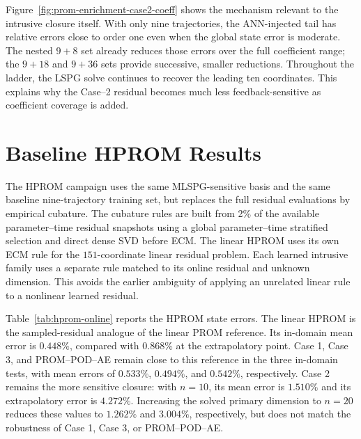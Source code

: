 \documentclass[11pt]{article}
\begin{document}
Figure~\ref{fig:prom-enrichment-case2-coeff} shows the mechanism relevant to the intrusive closure itself.  With
only nine trajectories, the ANN-injected tail has relative errors close to order one even when the global state error
is moderate.  The nested $9+8$ set already reduces those errors over the full coefficient range; the $9+18$ and
$9+36$ sets provide successive, smaller reductions.  Throughout the ladder, the LSPG solve continues to recover the leading ten
coordinates.  This explains why the Case--2 residual becomes much less feedback-sensitive as coefficient coverage
is added.

\section{Baseline HPROM Results}
The HPROM campaign uses the same MLSPG-sensitive basis and the same baseline nine-trajectory training set, but
replaces the full residual evaluations by empirical cubature.  The cubature rules are built from 2\% of the
available parameter--time residual snapshots using a global parameter--time stratified selection and direct dense
SVD before ECM.  The linear HPROM uses its own ECM rule for the \(151\)-coordinate linear residual problem.  Each
learned intrusive family uses a separate rule matched to its online residual and unknown dimension.  This avoids the
earlier ambiguity of applying an unrelated linear rule to a nonlinear learned residual.

\begin{table}[H]
\centering
\caption{Baseline HPROM cubature setup.  The learned \(n=10\) rows cover Case 1, Case 2 with \(n=10\), Case 3, and
PROM--POD--AE; Case 2 with \(n=20\) uses the larger \(n=20\) rule.}
\label{tab:hprom-ecm-setup}
\resizebox{0.9\textwidth}{!}{}
\end{table}

\begin{table}[H]
\centering
\caption{Baseline HPROM Stage--3 selected networks.  The full-coordinate master map is shared by POD--NN-ROM and
Case 2; the online Case 2 solver trims this \(q_{151}\) prediction and solves the first \(n\) coordinates.  Errors
are relative Frobenius percentages in coefficient space.}
\label{tab:hprom-training}
\resizebox{\textwidth}{!}{}
\end{table}

Table~\ref{tab:hprom-online} reports the HPROM state errors.  The linear HPROM is the sampled-residual analogue of
the linear PROM reference.  Its in-domain mean error is \(0.448\%\), compared with \(0.868\%\) at the extrapolatory
point.  Case 1, Case 3, and PROM--POD--AE remain close to this reference in the three in-domain tests, with mean
errors of \(0.533\%\), \(0.494\%\), and \(0.542\%\), respectively.  Case 2 remains the more sensitive closure:
with \(n=10\), its mean error is \(1.510\%\) and its extrapolatory error is \(4.272\%\).  Increasing the solved
primary dimension to \(n=20\) reduces these values to \(1.262\%\) and \(3.004\%\), respectively, but does not
match the robustness of Case 1, Case 3, or PROM--POD--AE.
\end{document}
